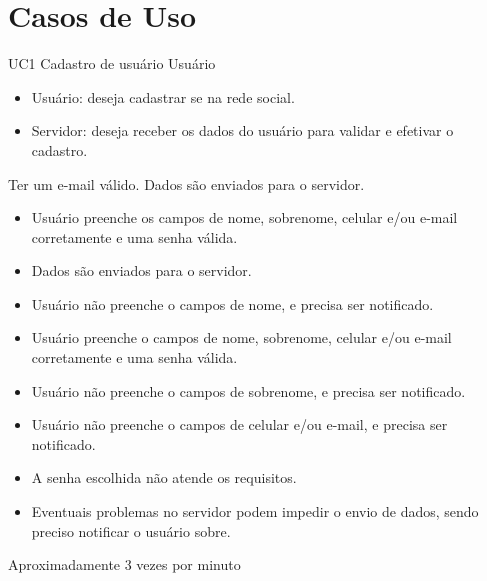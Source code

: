 \chapter{Casos de Uso}

\casoDeUso
{UC1}
{Cadastro de usuário}
{Usuário}
{
\begin{itemize}
	\item Usuário: deseja cadastrar se na rede social.
	\item Servidor: deseja receber os dados do usuário para validar e efetivar o cadastro.
\end{itemize}

}
{Ter um e-mail válido.}
{Dados são enviados para o servidor.}
{
\begin{itemize}
\item Usuário preenche os campos de nome, sobrenome,  celular e/ou e-mail corretamente e uma senha válida.
\item Dados são enviados para o servidor.
\end{itemize}
}
{
\begin{itemize}
\item Usuário não preenche o campos de nome, e precisa ser notificado.
\item Usuário preenche o campos de nome, sobrenome,  celular e/ou e-mail corretamente e uma senha válida.


\item Usuário não preenche o campos de sobrenome, e precisa ser notificado.

\item Usuário não preenche o campos de celular e/ou e-mail, e precisa ser notificado.

\item A senha escolhida não atende os requisitos.

\item Eventuais problemas no servidor podem impedir o envio de dados, sendo preciso notificar o usuário sobre.
\end{itemize}
}
{Aproximadamente 3 vezes por minuto}
{

}

